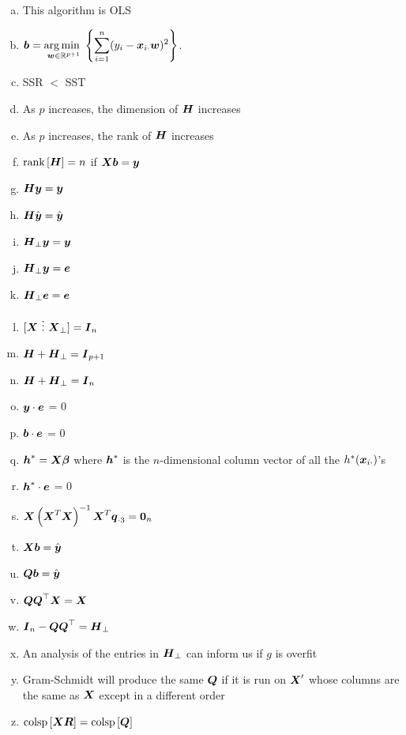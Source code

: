 \documentclass[12pt]{article}
\begin{document}
\begin{enumerate}[(a)]
\item This algorithm is OLS
\item $\b = \displaystyle\argmin_{\w \in \reals^{p + 1}}\braces{ \sum_{i=1}^n  (y_i - \x_{i \cdot} \w)^2}$.

\item SSR $<$ SST


\item As $p$ increases, the dimension of $\H$ increases
\item As $p$ increases, the rank of $\H$ increases
\item $\rank{\H} = n$ if $\X\b= \y$


\item $\H \y = \y$
\item $\H \yhat = \yhat$

\item $\H_\perp \y = \y$
\item $\H_\perp \y = \e$
\item $\H_\perp \e = \e$

\item $[\X~\vdots~\X_\perp] = \I_n$
\item $\H + \H_\perp = \I_{p+1}$
\item $\H + \H_\perp = \I_n$

\item $\y \cdot \e$ = 0
\item $\b \cdot \e$ = 0

\item $\bv{h}^* = \X\bbeta$ where $\bv{h}^*$ is the $n$-dimensional column vector of all the $h^*(\x_{i \cdot})$'s
\item $\bv{h}^* \cdot \e$ = 0 

\item $\XXtXinvXt \q_{\cdot 3} = \zerovec_n$

\item $\X\b = \yhat$
\item $\Q\b = \yhat$

\item $\Q\Q^\top\X = \X$
\item $\I_n - \Q\Q^\top = \H_\perp$


\item An analysis of the entries in $\H_\perp$ can inform us if $g$ is overfit

\item Gram-Schmidt will produce the same $\Q$ if it is run on $\X'$ whose columns are the same as $\X$ except in a different order
\item $\colsp{\X\R} = \colsp{\Q}$
\end{enumerate}
\end{document}
